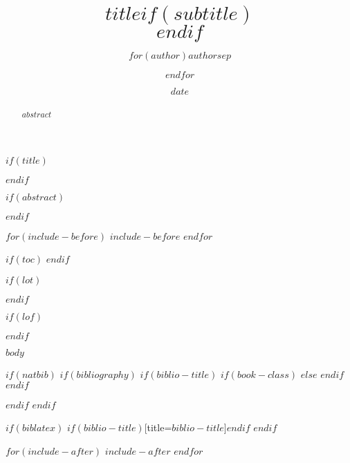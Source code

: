 \documentclass[10pt]{scrbook}
\title{$title$$if(subtitle)$\\\vspace{0.5em}{\large $subtitle$}$endif$}
\author{$for(author)$$author$$sep$ \and $endfor$}
\date{$date$}
\begin{document}
$if(title)$
	\maketitle
$endif$

$if(abstract)$
	\begin{abstract}
	$abstract$
	\end{abstract}
$endif$

$for(include-before)$
	$include-before$
$endfor$

$if(toc)$
	{
	\hypersetup{linkcolor=$if(toccolor)$$toccolor$$else$black$endif$}
	\setcounter{tocdepth}{$toc-depth$}
	\tableofcontents
	}
$endif$

$if(lot)$
	\listoftables
$endif$

$if(lof)$
	\listoffigures
$endif$

$body$

$if(natbib)$
	$if(bibliography)$
		$if(biblio-title)$
			$if(book-class)$
				\renewcommand\bibname{$biblio-title$}
			$else$
				\renewcommand\refname{$biblio-title$}
			$endif$
		$endif$
		
	$endif$
$endif$

$if(biblatex)$
	\printbibliography$if(biblio-title)$[title=$biblio-title$]$endif$
$endif$

$for(include-after)$
	$include-after$
$endfor$
\end{document}
